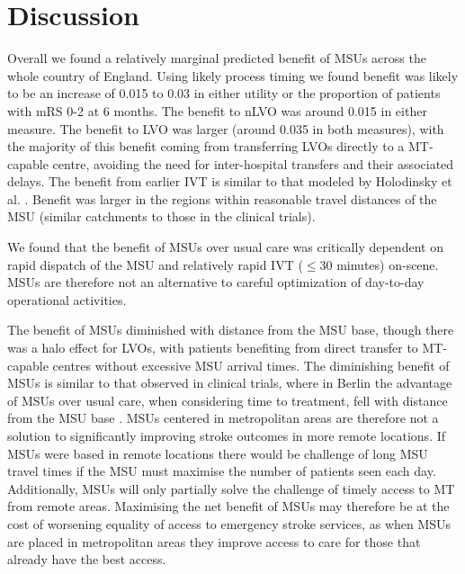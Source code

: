 \section{Discussion}



Overall we found a relatively marginal predicted benefit of MSUs across the whole country of England. Using likely process timing we found benefit was likely to be an increase of 0.015 to 0.03 in either utility or the proportion of patients with mRS 0-2 at 6 months. The benefit to nLVO was around 0.015 in either measure. The benefit to LVO was larger (around 0.035 in both measures), with the majority of this benefit coming from transferring LVOs directly to a MT-capable centre, avoiding the need for inter-hospital transfers and their associated delays. The benefit from earlier IVT is similar to that modeled by Holodinsky et al. \cite{holodinsky_jessalyn_k_what_2020}. Benefit was larger in the regions within reasonable travel distances of the MSU (similar catchments to those in the clinical trials). 

We found that the benefit of MSUs over usual care was critically dependent on rapid dispatch of the MSU and relatively rapid IVT ($\leq$30 minutes) on-scene. MSUs are therefore not an alternative to careful optimization of day-to-day operational activities.

The benefit of MSUs diminished with distance from the MSU base, though there was a halo effect for LVOs, with patients benefiting from direct transfer to MT-capable centres without excessive MSU arrival times. The diminishing benefit of MSUs is similar to that observed in clinical trials, where in Berlin the advantage of MSUs over usual care, when considering time to treatment, fell with distance from the MSU base \cite{koch_influence_2016}. MSUs centered in metropolitan areas are therefore not a solution to significantly improving stroke outcomes in more remote locations. If MSUs were based in remote locations there would be challenge of long MSU travel times if the MSU must maximise the number of patients seen each day. Additionally, MSUs will only partially solve the challenge of timely access to MT from remote areas. Maximising the net benefit of MSUs may therefore be at the cost of worsening equality of access to emergency stroke services, as when MSUs are placed in metropolitan areas they improve access to care for those that already have the best access.

